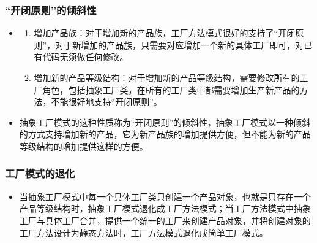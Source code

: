 \documentclass[letterpaper,10pt,english]{sphinxmanual}
\begin{document}
\subsubsection{“开闭原则”的倾斜性}
\label{\detokenize{creational_patterns/abstract_factory:id14}}\begin{itemize}
\item {} \begin{description}
\begin{enumerate}
%
\item {} 
\sphinxAtStartPar
增加产品族：对于增加新的产品族，工厂方法模式很好的支持了“开闭原则”，对于新增加的产品族，只需要对应增加一个新的具体工厂即可，对已有代码无须做任何修改。

\item {} 
\sphinxAtStartPar
增加新的产品等级结构：对于增加新的产品等级结构，需要修改所有的工厂角色，包括抽象工厂类，在所有的工厂类中都需要增加生产新产品的方法，不能很好地支持“开闭原则”。

\end{enumerate}

\end{description}

\item {} 
\sphinxAtStartPar
抽象工厂模式的这种性质称为“开闭原则”的倾斜性，抽象工厂模式以一种倾斜的方式支持增加新的产品，它为新产品族的增加提供方便，但不能为新的产品等级结构的增加提供这样的方便。

\end{itemize}


\subsubsection{工厂模式的退化}
\label{\detokenize{creational_patterns/abstract_factory:id15}}\begin{itemize}
\item {} 
\sphinxAtStartPar
当抽象工厂模式中每一个具体工厂类只创建一个产品对象，也就是只存在一个产品等级结构时，抽象工厂模式退化成工厂方法模式；当工厂方法模式中抽象工厂与具体工厂合并，提供一个统一的工厂来创建产品对象，并将创建对象的工厂方法设计为静态方法时，工厂方法模式退化成简单工厂模式。

\end{itemize}
\end{document}
